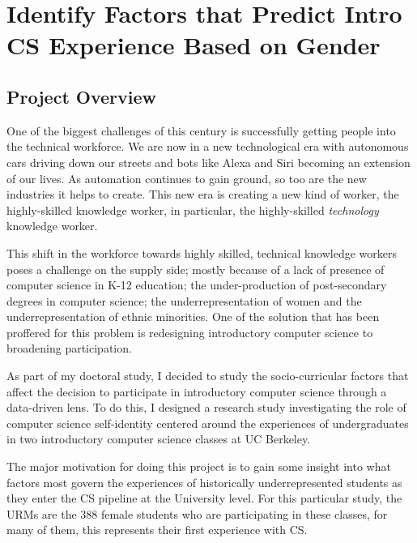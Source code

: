 
\chapter*{Identify Factors that Predict Intro CS Experience Based on Gender}

\section*{Project Overview}

One of the biggest challenges of this century is successfully getting people into the technical workforce. We are now in a new technological era with autonomous cars driving down our streets and bots like Alexa and Siri becoming an extension of our lives. As automation continues to gain ground, so too are the new industries it helps to create. This new era is creating a new kind of worker, the highly-skilled knowledge worker, in particular, the highly-skilled \emph{technology} knowledge worker.

This shift in the workforce towards highly skilled, technical knowledge workers poses a challenge on the supply side; mostly because of a lack of presence of computer science in K-12 education; the under-production of post-secondary degrees in computer science;  the underrepresentation of women and the underrepresentation of ethnic minorities. One of the solution that has been proffered for this problem is redesigning introductory computer science to broadening participation.  

As part of my doctoral study, I decided to study the socio-curricular factors that affect the decision to participate in introductory computer science through a data-driven lens. To do this, I designed a research study investigating the role of computer science self-identity centered around the experiences of undergraduates in two introductory computer science classes at UC Berkeley. 

The major motivation for doing this project is to gain some insight into what factors most govern the experiences of historically underrepresented students as they enter the CS pipeline at the University level. For this particular study, the URMs are the 388 female students who are participating in these classes, for many of them, this represents their first experience with CS. 

